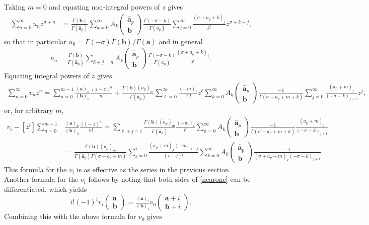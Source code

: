 \documentclass[12pt]{article}
\numberwithin{equation}{section}
\newcommand{\ParamS}[2] {( \begin{smallmatrix} #1 \\ #2 \end{smallmatrix})}
\begin{document}
Taking $m=0$ and equating non-integral powers of $z$ gives
\begin{align*}
\sum_{n=0}^\infty u_n z^{\sigma + n} &= \tfrac{\Gamma(\mathbf{b})}{\Gamma(\hat{\mathbf{a}}_p)} \sum_{k=0}^{\infty} {A_k \ParamS{\hat{\mathbf{a}}_p}{\mathbf{b} }}\tfrac{\Gamma (-\sigma-k)}{\Gamma (a_p)} \sum_{j=0}^\infty \tfrac{(\sigma+a_p+k)_j}{j!} z^{\sigma+k+j}\text{,}
\end{align*}
so that in particular $u_0=\Gamma(-\sigma)\Gamma(\mathbf b) / \Gamma (\mathbf a)$ and in general
\begin{align*}
u_n=\tfrac{\Gamma(\mathbf{b})}{\Gamma(\hat{\mathbf{a}}_p)} \sum_{k+j=n} A_k \ParamS{\hat{\mathbf{a}}_p}{\mathbf{b}} \tfrac{\Gamma (-\sigma-k)}{\Gamma (a_p)} \tfrac{(\sigma+a_p+k)_j}{j!}\text{.}
\end{align*}
Equating integral powers of $z$ gives 
\begin{align*}
\sum_{n=0}^\infty v_nz^n=\sum_{n=0}^{m-1}{\tfrac{(\mathbf{a})_n}{(\mathbf{b})_n} \tfrac{(1-z)^n}{n!}}+\tfrac{\Gamma(\mathbf{b})(a_p)_m}{\Gamma(\hat{\mathbf{a}}_p)} \sum_{\ell=0}^\infty \tfrac{(-m)_\ell}{\ell!}z^\ell \sum_{k=0}^{\infty} {A_k \ParamS{\hat{\mathbf{a}}_p}{\mathbf{b}}} \tfrac{-1}{\Gamma(\sigma+a_p+m+k)} \sum_{j=0}^{\infty} \tfrac{(a_p+m)_j}{(-\sigma-k)_{j+1}} z^j\text{,}
\end{align*}
or, for arbitrary $m$,
\begin{align*}
v_i - [z^i] \sum_{n=0}^{m-1}&{\tfrac{(\mathbf{a})_n}{(\mathbf{b})_n} \tfrac{(1-z)^n}{n!}} = \sum_{\ell +j=i}\tfrac{\Gamma(\mathbf{b})(a_p)_m}{\Gamma(\hat{\mathbf{a}}_p)} \tfrac{(-m)_\ell}{\ell!} \sum_{k=0}^{\infty} {A_k \ParamS{\hat{\mathbf{a}}_p}{\mathbf{b}}} \tfrac{-1}{\Gamma
	\left(\sigma+a_p+m+k\right)}\tfrac{(a_p+m)_j}{(-\sigma-k)_{j+1}}\\
&= \tfrac{\Gamma(\mathbf{b}) (a_p)_m}{\Gamma(\hat{\mathbf{a}}_p) \Gamma(\sigma+a_p+m)} \sum_{j=0}^{i}\tfrac{(a_p+m)_j (-m)_{i-j}}{(i-j)!}\sum_{k=0}^{\infty} {A_k\ParamS{\hat{\mathbf{a}}_p}{\mathbf{b}}} \tfrac{-1}{\left(\sigma+a_p+m\right)_k (-\sigma-k)_{j+1}}
\end{align*}
This formula for the $v_i$ is as effective as the series in the previous section. Another formula for the $v_i$ follows by noting that both sides of \eqref{nearone} can be differentiated, which yields
\begin{equation*}
i! (-1)^i v_i \ParamS{\mathbf{a}}{\mathbf{b}} = \tfrac{(\mathbf{a})_i}{(\mathbf{b})_i} v_0 \ParamS{\mathbf{a}+i}{\mathbf{b}+i}\text{.}
\end{equation*}
Combining this with the above formula for $v_0$ gives
\end{document}
